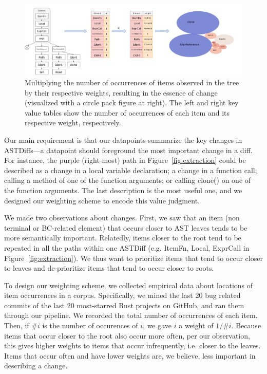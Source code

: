 \begin{figure}[h]
    \centering
    \includegraphics[width=1\textwidth]{figs/essence.drawio.pdf}
    \caption{\label{fig:essence}Multiplying the number of occurrences of items observed in the tree by their respective weights, resulting in the essence of change (visualized with a circle pack figure at right). The left and right key value tables show the number of occurrences of each item and its respective weight, respectively.}
\end{figure}

Our main requirement is that our datapoints summarize the key changes in ASTDiffs---a datapoint should foreground the most important change in a diff. For instance, the purple (right-most) path in Figure~\ref{fig:extraction} could be described as a change in a local variable declaration; a change in a function call; calling a method of one of the function arguments; or calling clone() on one of the function arguments. The last description is the most useful one, and we designed our weighting scheme to encode this value judgment.

We made two observations about changes. First, we saw that an item (non terminal or BC-related element) that occurs closer to AST leaves tends to be more semantically important. Relatedly, items closer to the root tend to be repeated in all the paths within one ASTDiff (e.g. ItemFn, Local, ExprCall in Figure~\ref{fig:extraction}). We thus want to prioritize items that tend to occur closer to leaves and de-prioritize items that tend to occur closer to roots.

To design our weighting scheme, we collected empirical data about locations of item occurrences in a corpus. Specifically, we mined the last 20 bug related commits of the last 20 most-starred Rust projects on GitHub, and ran them through our pipeline. We recorded the total number of occurrences of each item. Then, if $\# i$ is the number of occurences of $i$, we gave $i$ a weight of $1/\# i$. Because items that occur closer to the root also occur more often, per our observation, this gives higher weights to items that occur infrequently, i.e. closer to the leaves. Items that occur often and have lower weights are, we believe, less important in describing a change.

